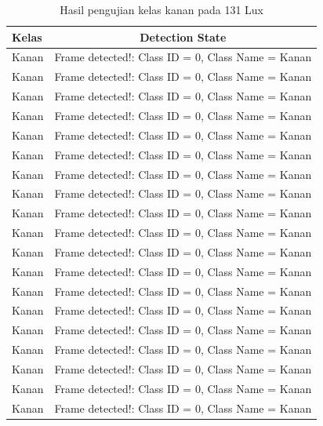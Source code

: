 \begin{longtable}{|l|c|}
  \caption{Hasil pengujian kelas kanan pada 131 Lux}
  \label{tb:lux131kanan} \\
  \hline
  \rowcolor[HTML]{C0C0C0} 
  \textbf{Kelas} & \textbf{Detection State}                           \\ \hline
  Kanan          & Frame detected!: Class ID = 0, Class Name = Kanan \\ \hline
  Kanan          & Frame detected!: Class ID = 0, Class Name = Kanan \\ \hline
  Kanan          & Frame detected!: Class ID = 0, Class Name = Kanan \\ \hline
  Kanan          & Frame detected!: Class ID = 0, Class Name = Kanan \\ \hline
  Kanan          & Frame detected!: Class ID = 0, Class Name = Kanan \\ \hline
  Kanan          & Frame detected!: Class ID = 0, Class Name = Kanan \\ \hline
  Kanan          & Frame detected!: Class ID = 0, Class Name = Kanan \\ \hline
  Kanan          & Frame detected!: Class ID = 0, Class Name = Kanan \\ \hline
  Kanan          & Frame detected!: Class ID = 0, Class Name = Kanan \\ \hline
  Kanan          & Frame detected!: Class ID = 0, Class Name = Kanan \\ \hline
  Kanan          & Frame detected!: Class ID = 0, Class Name = Kanan \\ \hline
  Kanan          & Frame detected!: Class ID = 0, Class Name = Kanan \\ \hline
  Kanan          & Frame detected!: Class ID = 0, Class Name = Kanan \\ \hline
  Kanan          & Frame detected!: Class ID = 0, Class Name = Kanan \\ \hline
  Kanan          & Frame detected!: Class ID = 0, Class Name = Kanan \\ \hline
  Kanan          & Frame detected!: Class ID = 0, Class Name = Kanan \\ \hline
  Kanan          & Frame detected!: Class ID = 0, Class Name = Kanan \\ \hline
  Kanan          & Frame detected!: Class ID = 0, Class Name = Kanan \\ \hline
  Kanan          & Frame detected!: Class ID = 0, Class Name = Kanan \\ \hline

\end{longtable}
